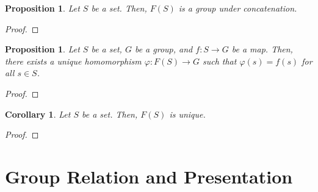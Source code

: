 \documentclass[a4paper, openany]{memoir}
\theoremstyle{definition}
\theoremstyle{plain}
\newtheorem{proposition}[definition]{Proposition}
\newtheorem{corollary}[definition]{Corollary}
\begin{document}
    \begin{proposition}
        Let $S$ be a set. Then, $F(S)$ is a group under concatenation.
    \end{proposition}
    \begin{proof}
        
    \end{proof}

    \begin{proposition}
        Let $S$ be a set, $G$ be a group, and $f: S \to G$ be a map. Then, there exists a unique homomorphism $\varphi: F(S) \to G$ such that $\varphi(s) = f(s)$ for all $s \in S$.
    \end{proposition}
    \begin{proof}
        
    \end{proof}

    \begin{corollary}
        Let $S$ be a set. Then, $F(S)$ is unique.
    \end{corollary}
    \begin{proof}
        
    \end{proof}
    \newpage

    \section{Group Relation and Presentation}
\end{document}
